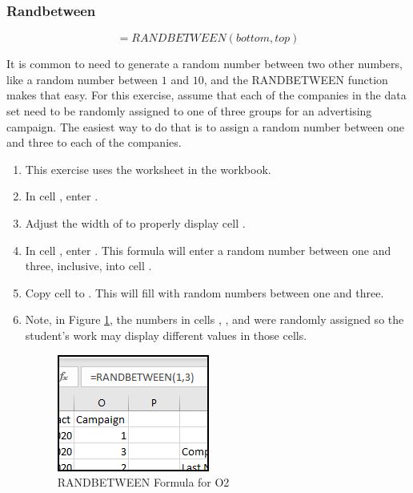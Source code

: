 \subsubsection{Randbetween}

\[ =RANDBETWEEN(bottom, top) \]

It is common to need to generate a random number between two other numbers, like a random number between $ 1 $ and $ 10 $, and the RANDBETWEEN function makes that easy. For this exercise, assume that each of the companies in the data set need to be randomly assigned to one of  three groups for an advertising campaign. The easiest way to do that is to assign a random number between one and three to each of the companies.

\begin{enumbox}
	\begin{enumerate}
		\item This exercise uses the  worksheet in the  workbook.
		\item In cell , enter .
		\item Adjust the width of  to properly display cell .
		\item In cell , enter . This formula will enter a random number between one and three, inclusive, into cell .
		\item Copy cell  to . This will fill  with random numbers between one and three.
		\item Note, in Figure \ref{09:fig44}, the numbers in cells , , and  were randomly assigned so the student's work may display different values in those cells.
		
		\begin{figure}[H]
			\centering
			\includegraphics[width=\maxwidth{.50\linewidth}]{gfx/ch09_fig44}
			\caption{RANDBETWEEN Formula for O2}
			\label{09:fig44}
		\end{figure}
		
	\end{enumerate}
\end{enumbox}

